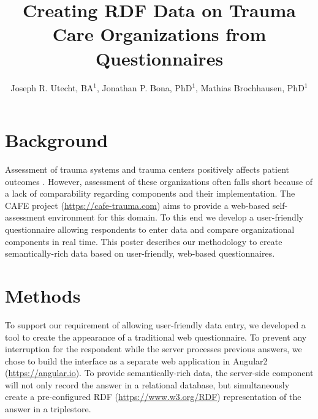 \documentclass{amia}
\begin{document}
\title{Creating RDF Data on Trauma Care Organizations from Questionnaires}

\author{Joseph R. Utecht, BA$^{1}$, Jonathan P. Bona, PhD$^{1}$, Mathias Brochhausen, PhD$^{1}$}


\maketitle

\section*{Background}

Assessment of trauma systems and trauma centers positively affects patient outcomes \cite{ref1, ref2}.
However, assessment of these organizations often falls short because of a lack of comparability regarding components and their implementation.
The CAFE project (\href{https://cafe-trauma.com}{https://cafe-trauma.com}) aims to provide a web-based self-assessment environment for this domain.
To this end we develop a user-friendly questionnaire allowing respondents to enter data and compare organizational components in real time.
This poster describes our methodology to create semantically-rich data based on user-friendly, web-based questionnaires.


\section*{Methods}
To support our requirement of allowing user-friendly data entry, we developed a tool to create the appearance of a traditional web questionnaire.
To prevent any interruption for the respondent while the server processes previous answers, we chose to build the interface as a separate web application in Angular2 (\href{https://angular.io}{https://angular.io}).
To provide semantically-rich data, the server-side component will not only record the answer in a relational database, but simultaneously create a pre-configured RDF (\href{https://www.w3.org/RDF}{https://www.w3.org/RDF}) representation of the answer in a triplestore.
\end{document}
